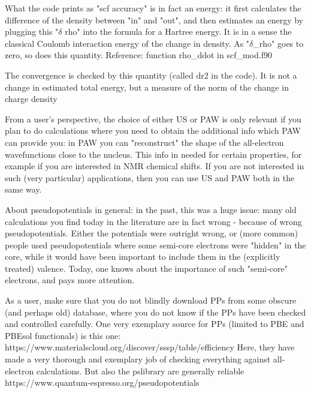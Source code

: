 
  What the code prints as "scf accuracy" is in fact an energy: it first calculates the difference of the density between "in" and "out", and then estimates an energy by plugging this "$\delta$ rho" into the formula for a Hartree energy. It is in a sense the classical Coulomb interaction energy of the change in density. As "$\delta$\_rho" goes to zero, so does this quantity. Reference: function rho\_ddot in scf\_mod.f90


  The convergence is checked by this quantity (called dr2 in the code). It is not a change in estimated total energy, but a measure of the norm of the change in charge density


  From a user's perspective, the choice of either US or PAW is only relevant if you plan to do calculations  where you need to obtain the additional info which PAW can provide you: in PAW you can "reconstruct" the shape of the all-electron wavefunctions close to the nucleus. This info in needed for certain properties, for example if you are interested in NMR chemical shifts. If you are not interested in such (very particular) applications, then you can use US and PAW both in the same way.

  About pseudopotentials in general: in the past, this was a huge issue: many old calculations you find today in the literature are in fact wrong - because of wrong pseudopotentials. Either the potentials were outright wrong, or (more common) people used pseudopotentials where some semi-core electrons were "hidden" in the core, while it would have been important to include them in the (explicitly treated) valence. Today, one knows about the importance of such "semi-core" electrons, and pays more attention.

  As a user, make sure that you do not blindly download PPs from some obscure (and perhaps old) database, where you do not know if the PPs have been checked and controlled carefully. One very exemplary source for PPs (limited to PBE and PBEsol functionals) is this one: https://www.materialscloud.org/discover/sssp/table/efficiency Here, they have made a very thorough and exemplary job of checking everything against all-electron calculations. But also the pslibrary are generally reliable https://www.quantum-espresso.org/pseudopotentials

